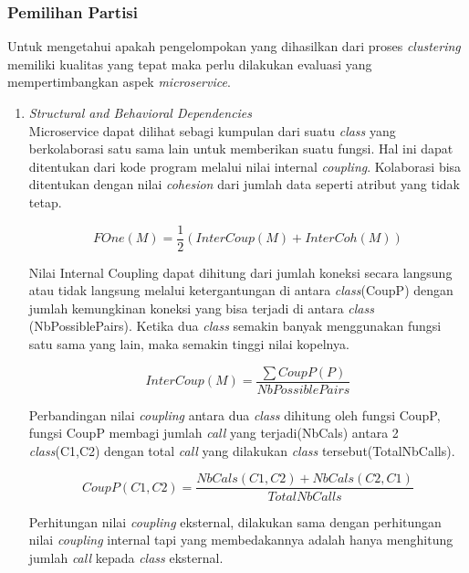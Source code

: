 \subsubsection{Pemilihan Partisi}
Untuk mengetahui apakah pengelompokan yang dihasilkan dari proses \textit{clustering} memiliki kualitas yang tepat maka perlu dilakukan evaluasi yang mempertimbangkan aspek \textit{microservice}.	
\begin{enumerate}[leftmargin=1.3cm]
	\item \textit{Structural and Behavioral Dependencies} \cite{5B1}\\
	Microservice dapat dilihat sebagi kumpulan dari suatu \textit{class} yang berkolaborasi satu sama lain untuk memberikan suatu fungsi. Hal ini dapat ditentukan dari kode program melalui nilai internal \textit{coupling}. Kolaborasi bisa ditentukan dengan nilai \textit{cohesion} dari jumlah data seperti atribut yang tidak tetap.

	\begin{equation}
		F O n e(M)=\frac{1}{2}(I n t e r C o u p(M)+I n t e r C o h(M))
	\end{equation}
	
	Nilai Internal Coupling dapat dihitung dari jumlah koneksi secara langsung atau tidak langsung melalui ketergantungan di antara \textit{class}(CoupP) dengan jumlah kemungkinan koneksi yang bisa terjadi di antara \textit{class} (NbPossiblePairs). Ketika dua \textit{class} semakin banyak menggunakan fungsi satu sama yang lain, maka semakin tinggi nilai kopelnya. 

	\begin{equation}
		I n t e r C o u p(M)=\frac{\sum C o u p P(P)}{N b P o s s i b l e P a i r s}
	\end{equation}
	
	Perbandingan nilai \textit{coupling} antara dua \textit{class} dihitung oleh fungsi CoupP, fungsi CoupP membagi jumlah \textit{call} yang terjadi(NbCals) antara 2 \textit{class}(C1,C2) dengan total \textit{call} yang dilakukan \textit{class} tersebut(TotalNbCalls).

	\begin{equation}
		C o u p P(C1,C2)={\frac{N b C a l s(C1,C2)+N b C a l s(C2,C1)}{T o t a l N b C a l l s}}
	\end{equation}	
	
	Perhitungan nilai \textit{coupling} eksternal, dilakukan sama dengan perhitungan nilai \textit{coupling} internal tapi yang membedakannya adalah hanya menghitung jumlah \textit{call} kepada \textit{class} eksternal.
	

\end{enumerate}
